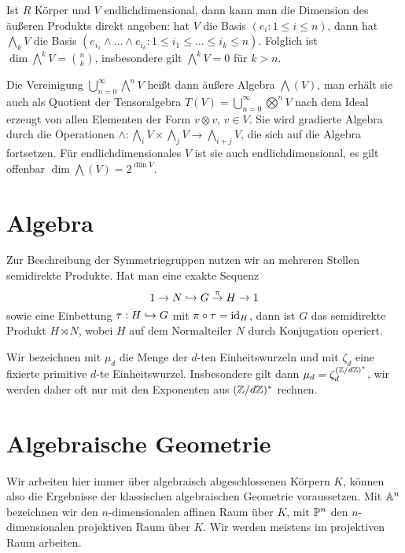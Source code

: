 Ist $R$ Körper und $V$ endlichdimensional, dann kann man die Dimension des äußeren Produkts direkt angeben: hat $V$ die Basis $(e_i : 1 \leq i \leq n)$, dann hat $\bigwedge_k V$ die Basis $(e_{i_1} \wedge \dots \wedge e_{i_k} : 1 \leq i_1 \leq \dots \leq i_k \leq n )$. Folglich ist $\dim \bigwedge^k V = \binom nk$, insbesondere gilt $\bigwedge^k V = 0$ für $k > n$.

Die Vereinigung $\bigcup_{n=0}^\infty \bigwedge^n V$ heißt dann äußere Algebra $\bigwedge(V)$, man erhält sie auch als Quotient der Tensoralgebra $T(V) = \bigcup_{n=0}^\infty \bigotimes^n V$ nach dem Ideal erzeugt von allen Elementen der Form $v \otimes v$, $v \in V$. Sie wird gradierte Algebra durch die Operationen $\wedge: \bigwedge_i V \times \bigwedge_j V \to \bigwedge_{i+j} V$, die sich auf die Algebra fortsetzen. Für endlichdimensionales $V$ ist sie auch endlichdimensional, es gilt offenbar $\dim \bigwedge(V) = 2^{\dim V}$.

\section{Algebra}
Zur Beschreibung der Symmetriegruppen nutzen wir an mehreren Stellen semidirekte Produkte. Hat man eine exakte Sequenz
\begin{equation}
1 \to N \into G \overrel\to^\pi H \to 1
\end{equation}
sowie eine Einbettung $\tau: H \hookrightarrow G$ mit $\pi \circ \tau = \operatorname{id}_H$, dann ist $G$ das semidirekte Produkt $H \rtimes N$, wobei $H$ auf dem Normalteiler $N$ durch Konjugation operiert.


Wir bezeichnen mit $\mu_d$ die Menge der $d$-ten Einheitswurzeln und mit $\zeta_d$ eine fixierte primitive $d$-te Einheitswurzel. Insbesondere gilt dann $\mu_d = \zeta_d^{(\Zmod dZ)^*}$, wir werden daher oft nur mit den Exponenten aus $(\Zmod dZ)^*$ rechnen.

\section{Algebraische Geometrie}
Wir arbeiten hier immer über algebraisch abgeschlossenen Körpern $K$, können also die Ergebnisse der klassischen algebraischen Geometrie voraussetzen. Mit $\mathbb A^{n}$ bezeichnen wir den $n$-dimensionalen affinen Raum über $K$, mit $\mathbb P^{n}$ den $n$-dimensionalen projektiven Raum über $K$. Wir werden meistens im projektiven Raum arbeiten.


